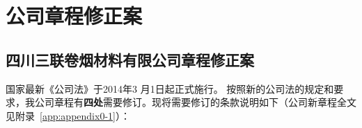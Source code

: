 ﻿\chapter{公司章程修正案}
\section{四川三联卷烟材料有限公司章程修正案}\sanhao
国家最新《公司法》于2014年3 月1日起正式施行。
按照新的公司法的规定和要求，我公司章程有\textbf{四处}需要修订。现将需要修订的条款说明如下（公司新章程全文见附录~\ref{app:appendix0-1}）：



%
